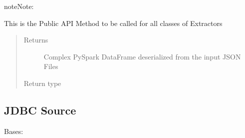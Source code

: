 \documentclass[a4paper,10pt, twoside,english]{sphinxmanual}
\begin{document}
\begin{fulllineitems}
\begin{sphinxadmonition}{note}{Note:}
\begin{description}
\end{description}
\end{sphinxadmonition}

\begin{fulllineitems}
\label{\detokenize{extractor/json:spooq2.extractor.json_files.JSONExtractor.extract}}
This is the Public API Method to be called for all classes of Extractors
\begin{quote}\begin{description}
\item[{Returns}] \leavevmode
Complex PySpark DataFrame deserialized from the input JSON Files

\item[{Return type}] \leavevmode
{}

\end{description}\end{quote}

\end{fulllineitems}


\end{fulllineitems}



\subsection{JDBC Source}
\label{\detokenize{extractor/jdbc:module-spooq2.extractor.jdbc}}\label{\detokenize{extractor/jdbc:jdbc-source}}\label{\detokenize{extractor/jdbc::doc}}

\begin{fulllineitems}
\label{\detokenize{extractor/jdbc:spooq2.extractor.jdbc.JDBCExtractor}}
Bases: {\hyperref[\detokenize{base_classes/extractor:spooq2.extractor.extractor.Extractor}]{}}

\end{fulllineitems}
\end{document}
